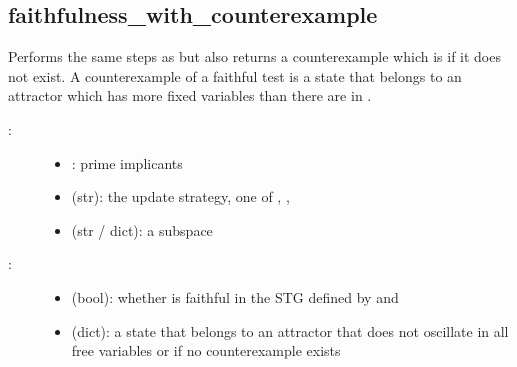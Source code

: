 \documentclass[letterpaper,10pt,english]{sphinxmanual}
\begin{document}
\subsection{faithfulness\_with\_counterexample}
\label{\detokenize{AttractorDetection:faithfulness-with-counterexample}}\label{\detokenize{AttractorDetection:id8}}

\begin{fulllineitems}
\label{\detokenize{AttractorDetection:PyBoolNet.AttractorDetection.faithfulness_with_counterexample}}
Performs the same steps as {\hyperref[\detokenize{AttractorDetection:faithfulness}]{}} but also returns a counterexample which is  if it does not exist.
A counterexample of a faithful test is a state that belongs to an attractor which has more fixed variables than there are in .
\begin{description}
\item[{:}] \leavevmode\begin{itemize}
\item {} 
: prime implicants

\item {} 
 (str): the update strategy, one of , , 

\item {} 
 (str / dict): a subspace

\end{itemize}

\item[{:}] \leavevmode\begin{itemize}
\item {} 
 (bool): whether  is faithful in the STG defined by  and 

\item {} 
 (dict): a state that belongs to an attractor that does not oscillate in all free variables or  if no counterexample exists


\end{itemize}
\end{description}
\end{fulllineitems}
\end{document}
